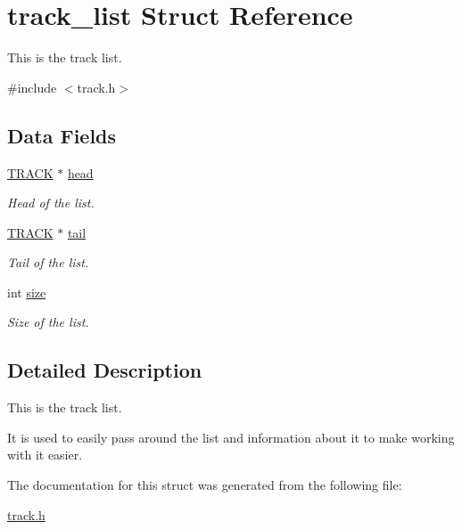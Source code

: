 \hypertarget{structtrack__list}{\section{track\-\_\-list Struct Reference}
\label{structtrack__list}
}


This is the track list.  




{\ttfamily \#include $<$track.\-h$>$}

\subsection*{Data Fields}
{\bf }\par
\begin{DoxyCompactItemize}
\item 
\hypertarget{structtrack__list_aad4b3c8ad0968dd39253fa060e0550f1}{\hyperlink{track_8h_a1168d7895be9688fc0d8644aab306d6b}{T\-R\-A\-C\-K} $\ast$ \hyperlink{structtrack__list_aad4b3c8ad0968dd39253fa060e0550f1}{head}}\label{structtrack__list_aad4b3c8ad0968dd39253fa060e0550f1}

\begin{DoxyCompactList}\small\item\em Head of the list. \end{DoxyCompactList}\item 
\hypertarget{structtrack__list_a389b7a91e6a469920637ebb124d856d8}{\hyperlink{track_8h_a1168d7895be9688fc0d8644aab306d6b}{T\-R\-A\-C\-K} $\ast$ \hyperlink{structtrack__list_a389b7a91e6a469920637ebb124d856d8}{tail}}\label{structtrack__list_a389b7a91e6a469920637ebb124d856d8}

\begin{DoxyCompactList}\small\item\em Tail of the list. \end{DoxyCompactList}\item 
\hypertarget{structtrack__list_a8a7cdffb59a2ca391ec85c7328af7c36}{int \hyperlink{structtrack__list_a8a7cdffb59a2ca391ec85c7328af7c36}{size}}\label{structtrack__list_a8a7cdffb59a2ca391ec85c7328af7c36}

\begin{DoxyCompactList}\small\item\em Size of the list. \end{DoxyCompactList}\end{DoxyCompactItemize}



\subsection{Detailed Description}
This is the track list. 

It is used to easily pass around the list and information about it to make working with it easier. 

The documentation for this struct was generated from the following file\-:\begin{DoxyCompactItemize}
\item 
\hyperlink{track_8h}{track.\-h}\end{DoxyCompactItemize}
